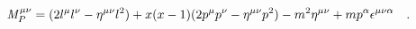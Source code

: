\begin{equation}
{\mathit {M} }^{\mu\nu}_{P} = (2 l^{\mu}l^{\nu}  - \eta^{\mu\nu}l^2)
+  x(x-1)(2 p^{\mu}p^{\nu} -\eta ^{\mu\nu}p^2)
- m^2\eta^{\mu\nu} + mp^{\alpha} \epsilon^{\mu\nu\alpha} ~~~.\\
\end{equation}

